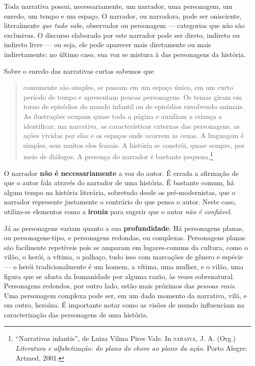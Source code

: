 \documentclass[11pt]{extarticle}
\begin{document}
Toda narrativa possui, necessariamente, um narrador, uma personagem, um enredo, um tempo e um espaço. O narrador, ou narradora, pode ser onisciente, literalmente \textit{que tudo sabe}, observador ou personagem --- categorias que não são exclusivas. O discurso elaborado por este narrador pode ser direto, indireto ou indireto livre --- ou seja, ele pode aparecer mais diretamente ou mais indiretamente; no último caso, sua voz se mistura à das personagens da história.

Sobre o enredo das narrativas curtas sabemos que

\begin{quote}
comumente são simples, se passam em um espaço único, em um curto período de tempo e apresentam poucas personagens. Os temas giram em torno de episódios do mundo infantil ou de episódios envolvendo animais. As ilustrações ocupam quase toda a página e auxiliam 
a criança a identificar, ma narrativa, as características externas das personagens, as ações vividas por elas e os espaços onde ocorrem as cenas. A linguagem é simples, sem muitos elos frasais. A história se constrói, quase sempre, por meio de diálogos. A presença do narrador é bastante pequena.\footnote{“Narrativas infantis”, de Luiza Vilma Pires Vale. In \textsc{saraiva}, J. A. (Org.) \textit{Literatura e alfabetização: do plano do choro ao plano da ação}. Porto Alegre: Artmed, 2001.}  
\end{quote}

O narrador \textbf{não é necessariamente} a voz do autor. É errada a afirmação de que o autor fala através do narrador de uma história. É bastante comum, há algum tempo na história literária, sobretudo desde os pré-modernistas, que o narrador represente justamente o contrário do que pensa o autor. Neste caso, utiliza-se elementos como a \textbf{ironia} para sugerir que o autor \textit{não é confiável}.

Já as personagens variam quanto a sua \textbf{profundidade}. Há personagens planas, ou personagens-tipo, e personagens redondas, ou complexas. Personagens planas são facilmente repetíveis pois se amparam em lugares-comuns da cultura, como o vilão, o herói, a vítima, o palhaço, tudo isso com marcações de gênero e espécie --- o herói tradicionalmente é um homem, a vítima, uma mulher, e o vilão, uma figura que se afasta da humanidade por alguma razão, às vezes sobrenatural. Personagens redondos, por outro lado, estão mais próximos das \textit{pessoas reais}. Uma personagem complexa pode ser, em um dado momento da narrativa, vilã, e em outro, heroína. É importante notar como as visões de mundo influenciam na caracterização das personagens de uma história.
\end{document}
